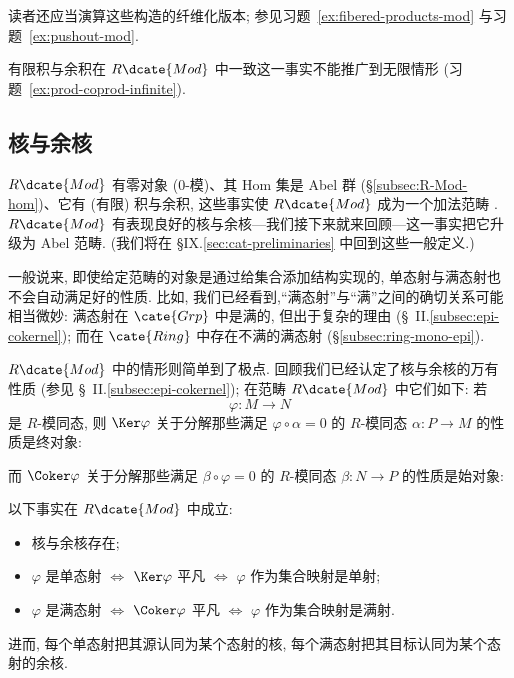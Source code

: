 读者还应当演算这些构造的纤维化版本; 参见习题~\ref{ex:fibered-products-mod} 与习题~\ref{ex:pushout-mod}.

有限积与余积在 $R\dcate{Mod}$ 中一致这一事实不能推广到无限情形 (习题~\ref{ex:prod-coprod-infinite}).

\subsection{核与余核}
\label{subsec:mod-ker-coker}

$R\dcate{Mod}$ 有零对象 ($0$-模)、其 Hom 集是 Abel 群 (\S\ref{subsec:R-Mod-hom})、它有 (有限) 积与余积, 这些事实使 $R\dcate{Mod}$ 成为一个加法范畴%
. $R\dcate{Mod}$ 有表现良好的核与余核---我们接下来就来回顾---这一事实把它升级为 Abel 范畴. (我们将在 \S IX.\ref{sec:cat-preliminaries} 中回到这些一般定义.)

一般说来, 即使给定范畴的对象是通过给集合添加结构实现的, 单态射与满态射也不会自动满足好的性质. 比如, 我们已经看到,``满态射''与``满''之间的确切关系可能相当微妙: 满态射在 $\cate{Grp}$ 中是满的, 但出于复杂的理由 (\S~II.\ref{subsec:epi-cokernel}); 而在 $\cate{Ring}$ 中存在不满的满态射 (\S\ref{subsec:ring-mono-epi}).

$R\dcate{Mod}$ 中的情形则简单到了极点. 回顾我们已经认定了核与余核的万有性质 (参见 \S~II.\ref{subsec:epi-cokernel}); 在范畴 $R\dcate{Mod}$ 中它们如下: 若
\[
\varphi : M \to N
\]
是 $R$-模同态, 则 $\Ker \varphi$ 关于分解那些满足 $\varphi \circ \alpha = 0$ 的 $R$-模同态 $\alpha : P \to M$ 的性质是终对象:
\begin{center}
\end{center}
而 $\Coker \varphi$ 关于分解那些满足 $\beta \circ \varphi = 0$ 的 $R$-模同态 $\beta : N \to P$ 的性质是始对象:
\begin{center}
\end{center}

\begin{proposition}
\label{prop:mod-ker-coker}
以下事实在 $R\dcate{Mod}$ 中成立:
\begin{itemize}
	\item 核与余核存在;
	\item $\varphi$ 是单态射 $\iff$ $\Ker \varphi$ 平凡 $\iff$ $\varphi$ 作为集合映射是单射;
	\item $\varphi$ 是满态射 $\iff$ $\Coker \varphi$ 平凡 $\iff$ $\varphi$ 作为集合映射是满射.
\end{itemize}
进而, 每个单态射把其源认同为某个态射的核, 每个满态射把其目标认同为某个态射的余核.
\end{proposition}

